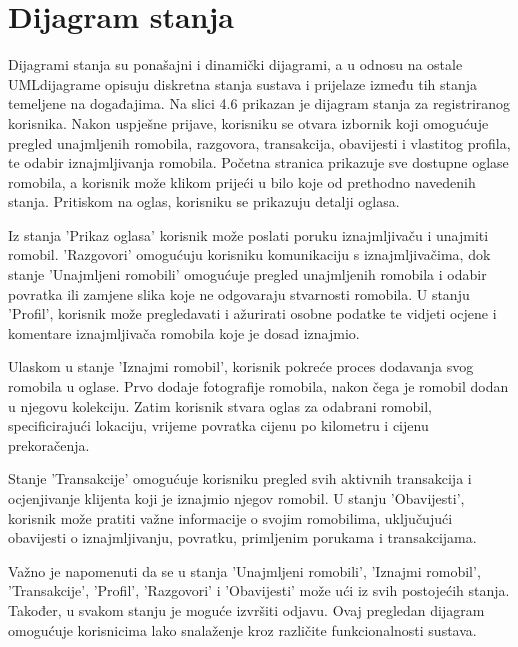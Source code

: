 		\section{Dijagram stanja}
			
			\indent Dijagrami stanja su ponašajni i dinamički dijagrami, a u odnosu na ostale UMLdijagrame opisuju diskretna stanja sustava i prijelaze između tih stanja temeljene na događajima. Na slici 4.6 prikazan je dijagram stanja za registriranog korisnika. Nakon uspješne prijave, korisniku se otvara izbornik koji omogućuje pregled unajmljenih romobila, razgovora, transakcija, obavijesti i vlastitog profila, te odabir iznajmljivanja romobila. Početna stranica prikazuje sve dostupne oglase romobila, a korisnik može klikom prijeći u bilo koje od prethodno navedenih stanja. 
			Pritiskom na oglas, korisniku se prikazuju detalji oglasa. 
			
			Iz stanja 'Prikaz oglasa' korisnik može poslati poruku iznajmljivaču i unajmiti romobil. 'Razgovori' omogućuju korisniku komunikaciju s iznajmljivačima, dok stanje 'Unajmljeni romobili' omogućuje pregled unajmljenih romobila i odabir povratka ili zamjene slika koje ne odgovaraju stvarnosti romobila. U stanju 'Profil', korisnik može pregledavati i ažurirati osobne podatke te vidjeti ocjene i komentare iznajmljivača romobila koje je dosad iznajmio.
			
			Ulaskom u stanje 'Iznajmi romobil', korisnik pokreće proces dodavanja svog romobila u oglase. Prvo dodaje fotografije romobila, nakon čega je romobil dodan u njegovu kolekciju. Zatim korisnik stvara oglas za odabrani romobil, specificirajući lokaciju, vrijeme povratka cijenu po kilometru i cijenu prekoračenja.
			
			Stanje 'Transakcije' omogućuje korisniku pregled svih aktivnih transakcija i ocjenjivanje 
			klijenta koji je iznajmio njegov romobil. U stanju 'Obavijesti', korisnik može pratiti važne informacije o svojim romobilima, 
			uključujući obavijesti o iznajmljivanju, povratku, primljenim porukama i transakcijama. 
			
			Važno je napomenuti da se u stanja 'Unajmljeni romobili', 'Iznajmi romobil', 'Transakcije', 
			'Profil', 'Razgovori' i 'Obavijesti' može ući iz svih postojećih stanja. Također, u svakom 
			stanju je moguće izvršiti odjavu. Ovaj pregledan dijagram omogućuje korisnicima lako 
			snalaženje kroz različite funkcionalnosti sustava.
			\\
			
